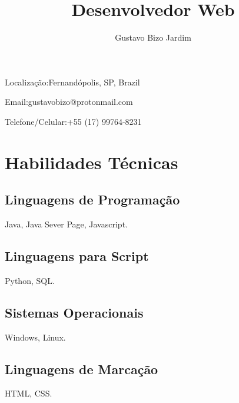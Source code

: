 \documentclass[16pt]{article}
\makeatletter
\renewcommand{\maketitle}
{
  \begin{center}
    \Huge\bfseries
    \textsf{\textbf{\thetitle}}

    \setstretch{1.25}
    \Large
    \textsf{\theauthor}
  \end{center}
  \normalsize
  \begin{minipage}[t]{0.5\linewidth}
    Localização:\hspace{0.2em}Fernand\'opolis, SP, Brazil
  \end{minipage}
  \hfill
  \begin{minipage}[t]{0.5\linewidth}
    \hfill
    Email:\hspace{0.2em}gustavobizo@protonmail.com

    \hfill
    Telefone/Celular:\hspace{0.2em}+55 (17) 99764-8231
  \end{minipage}
}
\makeatother
\begin{document}
  \thispagestyle{empty}
  \title{Desenvolvedor Web}
  \author{Gustavo Bizo Jardim}
  \maketitle
  \section{Habilidades Técnicas}
    \begin{minipage}[t]{0.47\linewidth}
      \subsection{Linguagens de Programação}
        Java, Java Sever Page, Javascript.\\
      \subsection{Linguagens para Script}
        Python, SQL.
      \subsection{Sistemas Operacionais}
        Windows, Linux.\\
    \end{minipage}
    \hfill\vline\hfill
    \begin{minipage}[t]{0.5\linewidth}
      \subsection{Linguagens de Marcação}
        HTML, CSS.\\
    \end{minipage}
\end{document}
